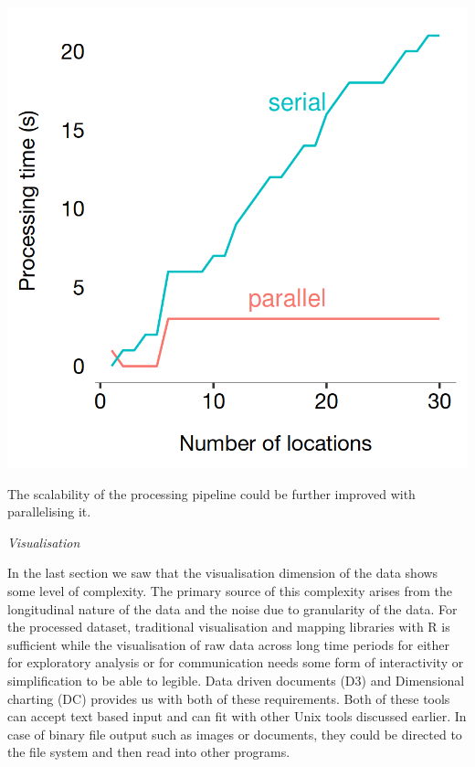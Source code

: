 \begin{marginfigure}[-4cm]
  \includegraphics[trim={0 0 0 0},clip]{images/processing-times-parallel.png}
  \caption{The scalability of the processing pipeline could be further improved with parallelising it.}
  \label{figure:toolkit:time:parallel}
\end{marginfigure}


\vspace{1.5em}\noindent\textit{Visualisation}\vspace{0.5em}

In the last section we saw that the visualisation dimension of the data shows some level of complexity.
The primary source of this complexity arises from the longitudinal nature of the data and the noise due to granularity of the data.
For the processed dataset, traditional visualisation and mapping libraries with R is sufficient while the visualisation of raw data across long time periods for either for exploratory analysis or for communication needs some form of interactivity or simplification to be able to legible.
Data driven documents (D3) \cite[-0.75cm]{stanford2011d3}and Dimensional charting (DC) provides us with both of these requirements.
Both of these tools can accept text based input and can fit with other Unix tools discussed earlier.
In case of binary file output such as images or documents, they could be directed to the file system and then read into other programs.

